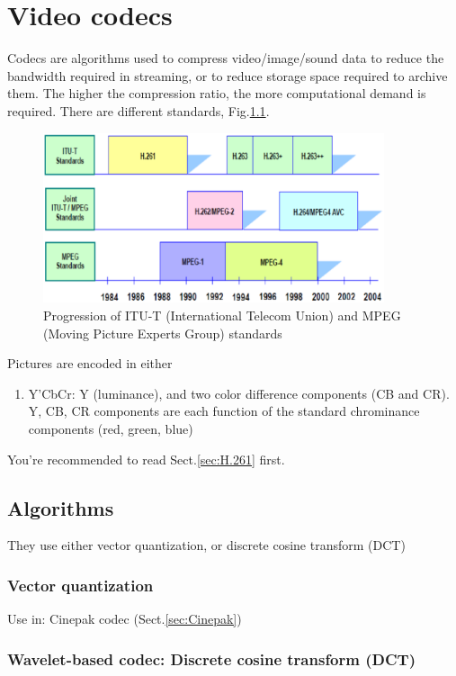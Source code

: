 \chapter{Video codecs}

Codecs are algorithms used to compress video/image/sound data to reduce the
bandwidth required in streaming, or to reduce storage space required to archive
them. The higher the compression ratio, the more computational demand is
required. There are different standards, Fig.\ref{fig:codec_standards}.

\begin{figure}[hbt]
  \centerline{\includegraphics[height=5cm,
    angle=0]{./images/codec_standards.eps}}
\caption{Progression of ITU-T (International Telecom Union) and MPEG (Moving
Picture Experts Group) standards}
\label{fig:codec_standards}
\end{figure}

Pictures are encoded in either
\begin{enumerate}
  \item Y'CbCr: Y (luminance), and two color difference components (CB and CR).
  Y, CB, CR components are each function of the standard chrominance components
  (red, green, blue)
\end{enumerate}
You're recommended to read Sect.\ref{sec:H.261} first.


\section{Algorithms}

They use either vector quantization, or discrete cosine transform (DCT)

\subsection{Vector quantization}

Use in: Cinepak codec (Sect.\ref{sec:Cinepak})

\subsection{Wavelet-based codec: Discrete cosine transform (DCT)}

